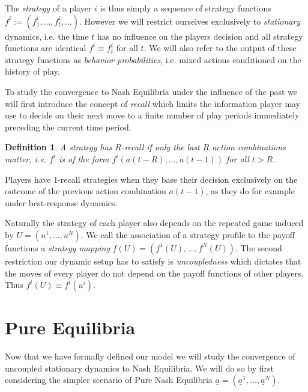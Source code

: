 \documentclass[a4paper]{article}
\theoremstyle{plain}
\newtheorem{definition}{Definition}
\theoremstyle{remark}
\newcommand{\eq}[1]{\underline{#1}}
\begin{document}
The \emph{strategy} of a player $i$ is thus simply a sequence of strategy
functions $f^i := (f^i_1, ..., f^i_t, ...)$. However we will restrict ourselves
exclusively to \emph{stationary} dynamics, i.e. the time $t$ has no influence on
the players decision and all strategy functions are identical $f^i \equiv f^i_t$ for
all $t$. We will also refer to the output of these strategy functions as \emph{behavior probabilities},
i.e. mixed actions conditioned on the history of play.

\medskip
To study the convergence to Nash Equilibria under the influence of the past
we will first introduce the concept of \emph{recall} which limits the information
player may use to decide on their next move to a finite number of play periods
immediately preceding the current time period.

\begin{definition}
    A strategy has $R$\emph{-recall} if only the last $R$ action combinations matter,
    i.e. $f^i$ is of the form $f^i(a(t-R), ..., a(t-1))$ for all $t > R$.
\end{definition}

Players have $1$-recall strategies when they base their decision exclusively on
the outcome of the previous action combination $a(t-1)$, as they do for example
under best-response dynamics.

Naturally the strategy of each player also depends on the repeated game
induced by $U = (u^1, ..., u^N)$. We call the association of a strategy profile
to the payoff functions a \emph{strategy mapping} $f(U) = (f^1(U), ..., f^N(U))$.
The second restriction our dynamic setup has to satisfy is \emph{uncoupledness}
which dictates that the moves of every player do not depend on the payoff
functions of other players. Thus $f^i(U) \equiv f^i(u^i)$.

\section{Pure Equilibria}

Now that we have formally defined our model we will study the convergence of
uncoupled stationary dynamics to Nash Equilibria. We will do so by first considering
the simpler scenario of Pure Nash Equilibria $\eq{a} = (\eq{a}^1, ..., \eq{a}^N)$.

\end{document}

